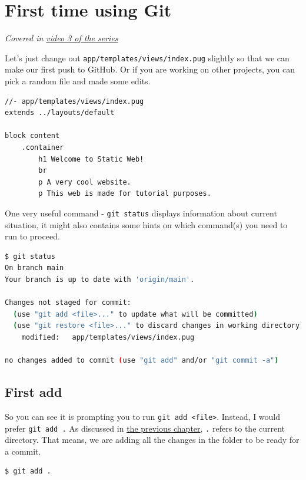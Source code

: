 \section{First time using Git}
\label{sec:gitfirst}

\textit{Covered in \href{https://www.youtube.com/watch?v=wQmFz-Ggxuo&list=PLjGmdnqrOKuYXiu7lgG5HW71jPEUd1XCm&index=4}{video 3 of the series}}
\vspace{6mm}

Let's just change out \texttt{app/templates/views/index.pug} slightly so that we can make our first push to GitHub. Or if you are working on other projects, you can pick a random file and made some edits.

\begin{lstlisting}[language=pug]
//- app/templates/views/index.pug
extends ../layouts/default

block content
	.container
		h1 Welcome to Static Web!
		br
		p A very cool website.
		p This web is made for tutorial purposes.
\end{lstlisting}

One very useful command - \texttt{git status} displays information about current situation, it might also contains some hints on which command(s) you need to run to proceed.

\begin{lstlisting}[language=bash]
$ git status
On branch main
Your branch is up to date with 'origin/main'.

Changes not staged for commit:
  (use "git add <file>..." to update what will be committed)
  (use "git restore <file>..." to discard changes in working directory)
	modified:   app/templates/views/index.pug

no changes added to commit (use "git add" and/or "git commit -a")
\end{lstlisting}

\subsection*{First add}
So you can see it is prompting you to run \texttt{git add <file>}. Instead, I would prefer \texttt{git add .} As discussed in \hyperref[sec:dir]{the previous chapter}, \texttt{.} refers to the current directory. That means, we are adding all the changes in the folder to be ready for a commit.

\begin{lstlisting}[language=bash]
$ git add .
\end{lstlisting}

